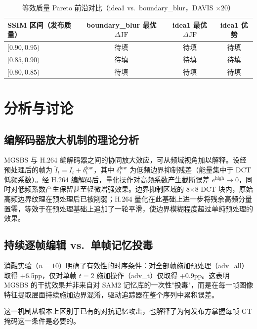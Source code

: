 \documentclass[UTF8,a4paper,12pt]{ctexart}
\begin{document}
\begin{table}[H]
\centering
\caption{等效质量 Pareto 前沿对比（idea1 vs.\ boundary\_blur，DAVIS $\times 20$）\protect\footnotemark}
\label{tab:pareto}
\begin{tabular}{lccc}
\toprule
SSIM 区间（发布质量） & boundary\_blur 最优 $\Delta\text{JF}$ & idea1 最优 $\Delta\text{JF}$ & idea1 优势 \\
\midrule
$[0.90, 0.95)$ & 待填 & 待填 & 待填 \\
$[0.85, 0.90)$ & 待填 & 待填 & 待填 \\
$[0.80, 0.85)$ & 待填 & 待填 & 待填 \\
\bottomrule
\end{tabular}
\end{table}

\section{分析与讨论}
\label{sec:analysis}

\subsection{编解码器放大机制的理论分析}

MGSBS 与 H.264 编解码器之间的协同放大效应，可从频域视角加以解释。设经预处理后的帧为 $\tilde{I}_t = I_t + \delta_t^{\text{low}}$，其中 $\delta_t^{\text{low}}$ 为低频边界抑制残差（能量集中于 DCT 低频系数）。经 H.264 编解码后，量化操作对高频系数产生截断误差 $e^{\text{high}} \to 0$，同时对低频系数产生保留甚至轻微增强效果。边界抑制区域的 8×8 DCT 块内，原始高频边界纹理在预处理后已被削弱；H.264 量化在此基础上进一步将残余高频分量置零，等效于在预处理基础上追加了一轮平滑，使边界模糊程度超过单纯预处理的效果。

\subsection{持续逐帧编辑 vs.\ 单帧记忆投毒}

消融实验（$n=10$）明确了有效性的时序条件：对全部帧施加预处理（adv\_all）取得 +6.5pp，仅对单帧 $t=2$ 施加操作（adv\_t）仅取得 +0.9pp。这表明 MGSBS 的干扰效果并非来自对 SAM2 记忆库的一次性"投毒"，而是在每一帧图像特征提取层面持续施加边界混淆，驱动追踪器在整个序列中累积误差。

这一机制从根本上区别于已有的对抗记忆攻击，也解释了为何发布方掌握每帧 GT 掩码这一条件是必要的。
\end{document}
